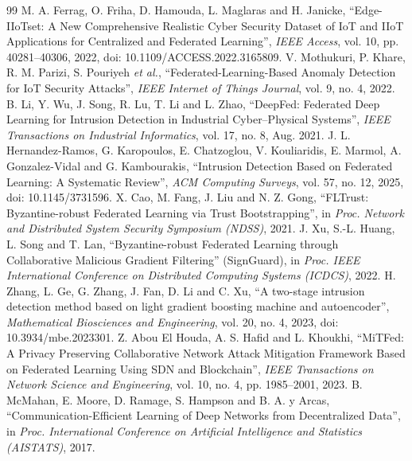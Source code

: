 \documentclass[12pt,a4paper]{report}
\begin{document}
\clearpage
\renewcommand{\bibname}{REFERENCES} %
\begin{thebibliography}{99}
 M. A. Ferrag, O. Friha, D. Hamouda, L. Maglaras and H. Janicke, ``Edge-IIoTset: A New Comprehensive Realistic Cyber Security Dataset of IoT and IIoT Applications for Centralized and Federated Learning'', \textit{IEEE Access}, vol. 10, pp. 40281--40306, 2022, doi: 10.1109/ACCESS.2022.3165809.
 V. Mothukuri, P. Khare, R. M. Parizi, S. Pouriyeh \textit{et al.}, ``Federated-Learning-Based Anomaly Detection for IoT Security Attacks'', \textit{IEEE Internet of Things Journal}, vol. 9, no. 4, 2022.
 B. Li, Y. Wu, J. Song, R. Lu, T. Li and L. Zhao, ``DeepFed: Federated Deep Learning for Intrusion Detection in Industrial Cyber--Physical Systems'', \textit{IEEE Transactions on Industrial Informatics}, vol. 17, no. 8, Aug. 2021.
 J. L. Hernandez-Ramos, G. Karopoulos, E. Chatzoglou, V. Kouliaridis, E. Marmol, A. Gonzalez-Vidal and G. Kambourakis, ``Intrusion Detection Based on Federated Learning: A Systematic Review'', \textit{ACM Computing Surveys}, vol. 57, no. 12, 2025, doi: 10.1145/3731596.
 X. Cao, M. Fang, J. Liu and N. Z. Gong, ``FLTrust: Byzantine-robust Federated Learning via Trust Bootstrapping'', in \textit{Proc. Network and Distributed System Security Symposium (NDSS)}, 2021.
 J. Xu, S.-L. Huang, L. Song and T. Lan, ``Byzantine-robust Federated Learning through Collaborative Malicious Gradient Filtering'' (SignGuard), in \textit{Proc. IEEE International Conference on Distributed Computing Systems (ICDCS)}, 2022.
 H. Zhang, L. Ge, G. Zhang, J. Fan, D. Li and C. Xu, ``A two-stage intrusion detection method based on light gradient boosting machine and autoencoder'', \textit{Mathematical Biosciences and Engineering}, vol. 20, no. 4, 2023, doi: 10.3934/mbe.2023301.
 Z. Abou El Houda, A. S. Hafid and L. Khoukhi, ``MiTFed: A Privacy Preserving Collaborative Network Attack Mitigation Framework Based on Federated Learning Using SDN and Blockchain'', \textit{IEEE Transactions on Network Science and Engineering}, vol. 10, no. 4, pp. 1985--2001, 2023.
 B. McMahan, E. Moore, D. Ramage, S. Hampson and B. A. y Arcas, ``Communication-Efficient Learning of Deep Networks from Decentralized Data'', in \textit{Proc. International Conference on Artificial Intelligence and Statistics (AISTATS)}, 2017.

\end{thebibliography}
\end{document}
